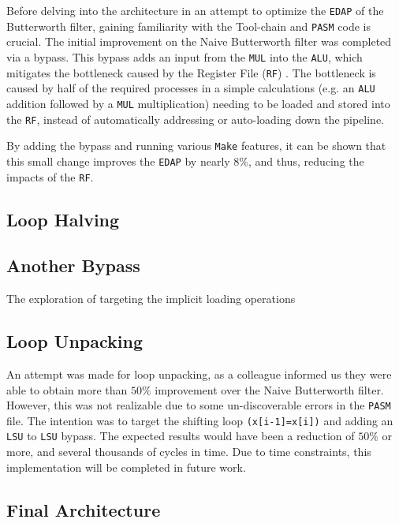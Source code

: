 \documentclass[letterpaper, 10 pt, conference]{ieeeconf}  %
\begin{document}
Before delving into the architecture in an attempt to optimize the \texttt{EDAP} of the Butterworth filter, gaining familiarity with the Tool-chain and \texttt{PASM} code is crucial. The initial improvement on the Naive Butterworth filter was completed via a bypass. This bypass adds an input from the \texttt{MUL} into the \texttt{ALU}, which mitigates the bottleneck caused by the Register File (\texttt{RF}) . The bottleneck is caused by half of the required processes in a simple calculations (e.g. an \texttt{ALU} addition followed by a \texttt{MUL} multiplication) needing to be loaded and stored into the \texttt{RF}, instead of automatically addressing or auto-loading down the pipeline. 

By adding the bypass and running various \texttt{Make} features, it can be shown that this small change improves the \texttt{EDAP} by nearly $8\%$, and thus, reducing the impacts of the \texttt{RF}. 



\subsection{Loop Halving}

\subsection{Another Bypass}

The exploration of targeting the implicit loading operations 

\subsection{Loop Unpacking}

An attempt was made for loop unpacking, as a colleague informed us they were able to obtain more than $50\%$ improvement over the Naive Butterworth filter. However, this was not realizable due to some un-discoverable errors in the \texttt{PASM} file. The intention was to target the shifting loop \texttt{(x[i-1]=x[i])} and adding an \texttt{LSU} to \texttt{LSU} bypass. The expected results would have been a reduction of $50\%$ or more, and several thousands of cycles in time. Due to time constraints, this implementation will be completed in future work.  

\subsection{Final Architecture}
\end{document}
